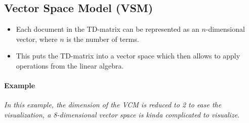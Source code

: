         \subsection{Vector Space Model (VSM)} %
            \begin{itemize}
            	\item Each document in the TD-matrix can be represented as an \(n\)-dimensional vector, where \(n\) is the number of terms.
            	\item This puts the TD-matrix into a vector space which then allows to apply operations from the linear algebra.
            \end{itemize}
        
        	\paragraph{Example}
        		\textit{In this example, the dimension of the VCM is reduced to 2 to ease the visualization, a 8-dimensional vector space is kinda complicated to visualize.}
        		
